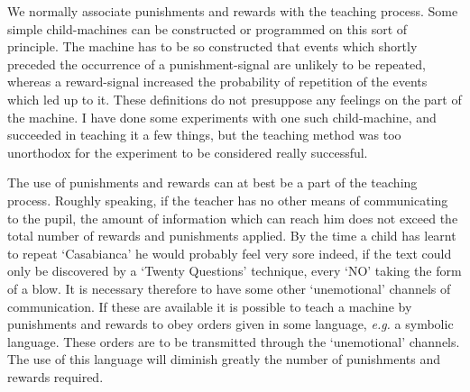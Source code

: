 \documentclass[12pt]{article}
\begin{document}
    We normally associate punishments and rewards with the teaching process. Some simple child-machines can be constructed or programmed on this sort of principle. The machine has to be so constructed that events which shortly preceded the occurrence of a punishment-signal are unlikely to be repeated, whereas a reward-signal increased the probability of repetition of the events which led up to it. These definitions do not presuppose any feelings on the part of the machine. I have done some experiments with one such child-machine, and succeeded in teaching it a few things, but the teaching method was too unorthodox for the experiment to be considered really successful.

    The use of punishments and rewards can at best be a part of the teaching process. Roughly speaking, if the teacher has no other means of communicating to the pupil, the amount of information which can reach him does not exceed the total number of rewards and punishments applied. By the time a child has learnt to repeat ‘Casabianca' he would probably feel very sore indeed, if the text could only be discovered by a ‘Twenty Questions' technique, every ‘NO' taking the form of a blow. It is necessary therefore to have some other ‘unemotional' channels of communication. If these are available it is possible to teach a machine by punishments and rewards to obey orders given in some language, \textit{e.g.} a symbolic language. These orders are to be transmitted through the ‘unemotional' channels. The use of this language will diminish greatly the number of punishments and rewards required.
\end{document}
